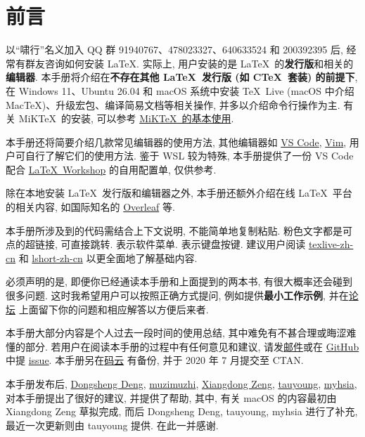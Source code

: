 
\chapter*{前言}

以``啸行''名义加入 QQ 群 91940767、478023327、640633524 和 200392395 后,
经常有群友咨询如何安装 \LaTeX.
实际上,
用户安装的是 \LaTeX\ 的\textbf{发行版}和相关的\textbf{编辑器}.
本手册将介绍在\textbf{不存在其他 \LaTeX\ 发行版 (如 C\TeX\ 套装) 的前提下},
在 Windows 11、Ubuntu 26.04 和 macOS 系统中安装
\TeX~Live (macOS 中介绍 Mac\TeX)、升级宏包、编译简易文档等相关操作,
并多以介绍命令行操作为主.
有关 MiK\TeX\ 的安装,
可以参考 \href{https://camusecao.top/2021-06-16/MiKTeX/}{MiK\TeX\ 的基本使用}.

本手册还将简要介绍几款常见编辑器的使用方法,
其他编辑器如 \href{https://code.visualstudio.com/}{VS Code},
\href{https://www.vim.org/}{Vim},
用户可自行了解它们的使用方法.
鉴于 WSL 较为特殊,
本手册提供了一份 VS Code 配合
\href{https://marketplace.visualstudio.com/items?itemName=James-Yu.latex-workshop}{\LaTeX\ Workshop}
的自用配置单,
仅供参考.

除在本地安装 \LaTeX\ 发行版和编辑器之外,
本手册还额外介绍在线 \LaTeX\ 平台的相关内容,
如国际知名的 \href{http://www.overleaf.com/}{Overleaf} 等.

本手册所涉及到的代码需结合上下文说明, 不能简单地复制粘贴.
粉色文字都是可点的超链接, 可直接跳转.
 表示软件菜单.  表示键盘按键.
建议用户阅读 \href{https://tug.org/texlive/doc/texlive-zh-cn/texlive-zh-cn.pdf}{\textsf{texlive-zh-cn}}
和 \href{http://mirrors.ctan.org/info/lshort/chinese/lshort-zh-cn.pdf}{\textsf{lshort-zh-cn}}
以更全面地了解基础内容.

必须声明的是,
即便你已经通读本手册和上面提到的两本书,
有很大概率还会碰到很多问题.
这时我希望用户可以按照正确方式提问,
例如提供\textbf{最小工作示例},
并在\href{https://ask.latexstudio.net/}{论坛}%
上面留下你的问题和相应解答以方便后来者.

本手册大部分内容是个人过去一段时间的使用总结, 其中难免有不甚合理或晦涩难懂的部分.
若用户在阅读本手册的过程中有任何意见和建议,
请发\href{mailto:ranwang.osbert@outlook.com}{邮件}或在
\href{https://github.com/OsbertWang/install-latex-guide-zh-cn}{GitHub} 中提
\href{https://github.com/OsbertWang/install-latex-guide-zh-cn/issues}{issue}.
本手册另在\href{https://gitee.com/OsbertWang/install-latex-guide-zh-cn}{码云}%
有备份,
并于 2020 年 7 月提交至 CTAN.

本手册发布后,
\href{https://github.com/EthanDeng}{Dongsheng Deng},
\href{https://github.com/muzimuzhi}{muzimuzhi},
\href{https://github.com/stone-zeng}{Xiangdong Zeng},
\href{https://github.com/taumasyang}{tauyoung},
\href{https://github.com/myhsia}{myhsia},
对本手册提出了很好的建议, 并提供了帮助,
其中, 有关 macOS 的内容最初由 Xiangdong Zeng 草拟完成,
而后 Dongsheng Deng, tauyoung, myhsia 进行了补充,
最近一次更新则由 tauyoung 提供.
在此一并感谢.

